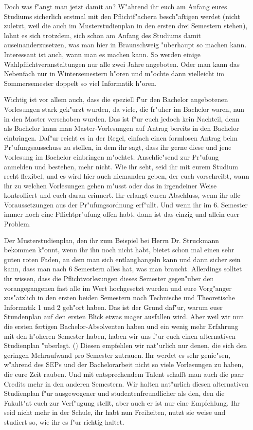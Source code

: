 Doch was f"angt man jetzt damit an? W"ahrend ihr euch am Anfang eures Studiums sicherlich
erstmal mit den Pflichtf"achern besch"aftigen werdet (nicht zuletzt, weil die auch im
Musterstudienplan in den ersten drei Semestern stehen), lohnt es sich trotzdem, sich schon am
Anfang des Studiums damit auseinanderzusetzen, was man hier in Braunschweig "uberhaupt so
machen kann. Interessant ist auch, wann man es machen kann. So werden einige
Wahlpflichtveranstaltungen nur alle zwei Jahre angeboten. Oder man kann das Nebenfach nur in
Wintersemestern h"oren und m"ochte dann vielleicht im Sommersemester doppelt so viel Informatik
h"oren.

Wichtig ist vor allem auch, dass die speziell f"ur den Bachelor angebotenen Vorlesungen stark
gek"urzt wurden, da viele, die fr"uher im Bachelor waren, nun in den Master verschoben wurden. Das
ist f"ur euch jedoch kein Nachteil, denn als Bachelor kann man Master-Vorlesungen auf Antrag
bereits in den Bachelor einbringen. Daf"ur reicht es in der Regel, einfach einen formlosen Antrag
beim Pr"ufungsausschuss zu stellen, in dem ihr sagt, dass ihr gerne diese und jene Vorlesung im
Bachelor einbringen m"ochtet. Anschlie"send zur Pr"ufung anmelden und bestehen, mehr nicht.
Wie ihr seht, seid ihr mit eurem Studium recht flexibel, und es wird hier auch niemanden geben, der
euch vorschreibt, wann ihr zu welchen Vorlesungen gehen m"usst oder das in irgendeiner Weise
kontrolliert und euch daran erinnert. Ihr erlangt euren Abschluss, wenn ihr alle Voraussetzungen aus
der Pr"ufungsordnung erf"ullt. Und wenn ihr im 6. Semester immer noch eine Pflichtpr"ufung offen
habt, dann ist das einzig und allein euer Problem.

Der Musterstudienplan, den ihr zum Beispiel bei Herrn Dr. Struckmann bekommen k"onnt, wenn ihr
ihn noch nicht habt, bietet schon mal einen sehr guten roten Faden, an dem man sich entlanghangeln
kann und dann sicher sein kann, dass man nach 6 Semestern alles hat, was man braucht. Allerdings
solltet ihr wissen, dass die Pflichtvorlesungen dieses Semester gegen"uber den vorangegangenen fast
alle im Wert hochgesetzt wurden und eure Vorg"anger zus"atzlich in den ersten beiden Semestern
noch Technische und Theoretische Informatik 1 und 2 geh"ort haben. Das ist der Grund daf"ur,
warum euer Stundenplan auf den ersten Blick etwas mager ausfallen wird. Aber weil wir nun die
ersten fertigen Bachelor-Absolventen haben und ein wenig mehr Erfahrung mit den h"oheren
Semester haben, haben wir uns f"ur euch einen alternativen Studienplan
"uberlegt. (\pageref{studienplan_neu})
Diesen empfehlen wir nat"urlich nur denen, die sich den geringen Mehraufwand pro Semester zutrauen. Ihr werdet es
sehr genie"sen, w"ahrend des SEPs und der Bachelorarbeit nicht so viele Vorlesungen zu haben, die
eure Zeit rauben. Und mit entsprechendem Talent schafft man auch die paar Credits mehr in den
anderen Semestern. Wir halten nat"urlich diesen alternativen Studienplan f"ur ausgewogener und
studentenfreundlicher als den, den die Fakult"at euch zur Verf"ugung stellt, aber auch er ist nur eine
Empfehlung. Ihr seid nicht mehr in der Schule, ihr habt nun Freiheiten, nutzt sie weise und studiert
so, wie ihr es f"ur richtig haltet.



